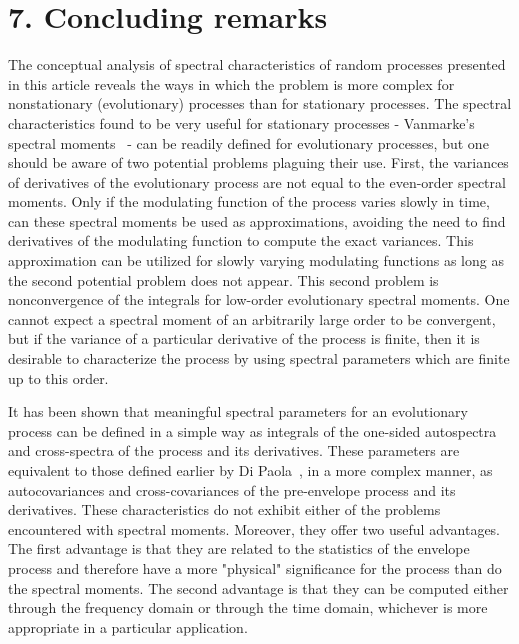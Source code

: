 \documentclass{article}
\begin{document}
\section*{7. Concluding remarks}

The conceptual analysis of spectral characteristics of random processes
presented in this article reveals the ways in which the problem is more
complex for nonstationary (evolutionary) processes than for stationary
processes. The spectral characteristics found to be very useful for stationary
processes - Vanmarke's spectral moments~{\cite{Vanmarke1972}} - can be readily
defined for evolutionary processes, but one should be aware of two potential
problems plaguing their use. First, the variances of derivatives of the
evolutionary process are not equal to the even-order spectral moments. Only if
the modulating function of the process varies slowly in time, can these
spectral moments be used as approximations, avoiding the need to find
derivatives of the modulating function to compute the exact variances. This
approximation can be utilized for slowly varying modulating functions as long
as the second potential problem does not appear. This second problem is
nonconvergence of the integrals for low-order evolutionary spectral moments.
One cannot expect a spectral moment of an arbitrarily large order to be
convergent, but if the variance of a particular derivative of the process is
finite, then it is desirable to characterize the process by using spectral
parameters which are finite up to this order.

It has been shown that meaningful spectral parameters for an evolutionary
process can be defined in a simple way as integrals of the one-sided
autospectra and cross-spectra of the process and its derivatives. These
parameters are equivalent to those defined earlier by Di
Paola~{\cite{DiPaola1985}}, in a more complex manner, as autocovariances and
cross-covariances of the pre-envelope process and its derivatives. These
characteristics do not exhibit either of the problems encountered with
spectral moments. Moreover, they offer two useful advantages. The first
advantage is that they are related to the statistics of the envelope process
and therefore have a more "physical" significance for the process than do the
spectral moments. The second advantage is that they can be computed either
through the frequency domain or through the time domain, whichever is more
appropriate in a particular application.
\end{document}

